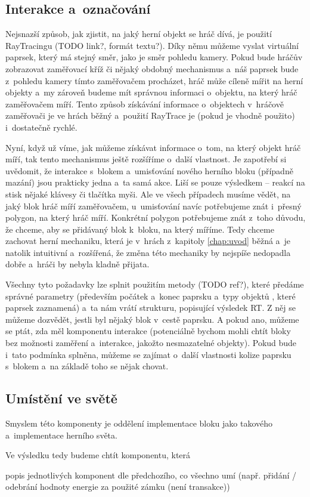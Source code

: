 \subsection{Interakce a~označování}

Nejsnazší způsob, jak zjistit, na jaký herní objekt se hráč dívá, je použití RayTracingu (TODO link?, formát textu?). Díky němu můžeme  vyslat virtuální paprsek, který má stejný směr, jako je směr pohledu kamery. Pokud bude hráčův \HUD{} zobrazovat zaměřovací kříž či nějaký obdobný mechanismus a~náš paprsek bude z~pohledu kamery tímto zaměřovačem procházet, hráč může cíleně mířit na herní objekty a~my zároveň budeme mít správnou informaci o~objektu, na který hráč zaměřovačem míří. Tento způsob získávání informace o~objektech v~hráčově zaměřovači je ve hrách běžný a~použití RayTrace je (pokud je vhodně použito) i~dostatečně rychlé.

Nyní, když už víme, jak můžeme získávat informace o~tom, na který objekt hráč míří, tak tento mechanismus ještě rozšíříme o~další vlastnost. Je zapotřebí si uvědomit, že interakce s~blokem a~umisťování nového herního bloku (případně mazání) jsou prakticky jedna a~ta samá akce. Liší se pouze výsledkem -- reakcí na stisk nějaké klávesy či tlačítka myši. Ale ve všech případech musíme vědět, na jaký blok hráč míří zaměřovačem, u~umisťování navíc potřebujeme znát i~přesný polygon, na který hráč míří. Konkrétní polygon potřebujeme znát z~toho důvodu, že chceme, aby se přidávaný blok  k~bloku, na který míříme. Tedy chceme zachovat herní mechaniku, která je v~hrách z~kapitoly \ref{chap:uvod} běžná a~je natolik intuitivní a~rozšířená, že změna této mechaniky by nejspíše nedopadla dobře a~hráči by nebyla kladně přijata.

Všechny tyto požadavky lze splnit použitím metody  (TODO ref?), které předáme správné parametry (především počátek a~konec paprsku a~typy objektů , které paprsek zaznamená) a~ta nám vrátí strukturu, popisující výsledek RT. Z něj se můžeme dozvědět, jestli byl nějaký blok v~cestě paprsku. A pokud ano, můžeme se ptát, zda měl komponentu interakce (potenciálně bychom mohli chtít bloky bez možnosti zaměření a~interakce, jakožto nesmazatelné objekty). Pokud bude i~tato podmínka splněna, můžeme se zajímat o~další vlastnosti kolize paprsku s~blokem a~na základě toho se nějak chovat.


\subsection{Umístění ve světě}

Smyslem této komponenty je oddělení implementace bloku jako takového a~implementace herního světa.


Ve výsledku tedy budeme chtít komponentu, která 

popis jednotlivých komponent dle předchozího, co všechno umí (např. přidání / odebrání hodnoty energie za použité zámku (není transakce))



